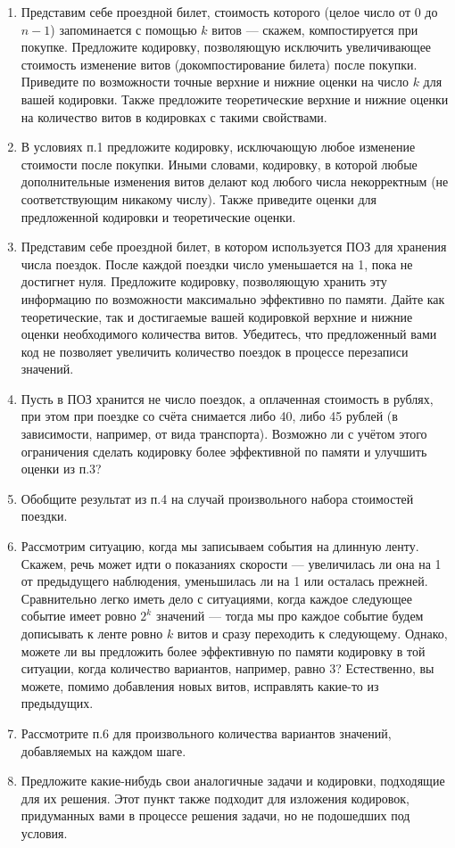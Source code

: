 \begin{enumerate}
\item Представим себе проездной билет, стоимость которого (целое число от 0 до $n-1$) 
запоминается с помощью $k$ витов --- скажем, компостируется при покупке. Предложите кодировку, 
позволяющую исключить увеличивающее стоимость изменение витов (докомпостирование билета)
после покупки. Приведите по возможности точные верхние и нижние оценки на число $k$ для вашей кодировки. Также предложите 
теоретические верхние и нижние оценки на количество витов в кодировках с такими свойствами.
\item В условиях п.1 предложите кодировку, исключающую любое изменение стоимости после покупки.
Иными словами, кодировку, в которой любые дополнительные изменения витов делают код любого
числа некорректным (не соответствующим никакому числу). Также приведите оценки для предложенной 
кодировки и теоретические оценки.
\item Представим себе проездной билет, в котором используется ПОЗ для хранения числа поездок.
После каждой поездки число уменьшается на 1, пока не достигнет нуля. Предложите кодировку, 
позволяющую хранить эту информацию по возможности максимально эффективно по памяти. Дайте 
как теоретические, так и достигаемые вашей кодировкой верхние и нижние оценки необходимого количества 
витов.
Убедитесь, что предложенный вами код не позволяет увеличить количество поездок в процессе
перезаписи значений.
\item Пусть в ПОЗ хранится не число поездок, а оплаченная стоимость в рублях, при этом 
при поездке со счёта снимается либо 40, либо 45 рублей (в зависимости, например, от вида
транспорта). Возможно ли с учётом этого ограничения сделать кодировку более эффективной по
памяти и улучшить оценки из п.3?
\item Обобщите результат из п.4 на случай произвольного набора стоимостей поездки.
\item Рассмотрим ситуацию, когда мы записываем события на длинную ленту. Скажем, речь может
идти о показаниях скорости --- увеличилась ли она на 1 от предыдущего наблюдения, 
уменьшилась ли на 1 или осталась прежней. Сравнительно легко иметь дело с ситуациями, когда
каждое следующее событие имеет ровно $2^k$ значений --- тогда мы про каждое событие будем 
дописывать к ленте ровно $k$ витов и сразу переходить к следующему. 
Однако, можете ли вы предложить более эффективную по памяти кодировку в той ситуации, 
когда количество вариантов, например, равно 3? Естественно, вы можете, помимо добавления 
новых витов, исправлять какие-то из предыдущих.
\item Рассмотрите п.6 для произвольного количества вариантов значений, добавляемых на каждом шаге.
\item Предложите какие-нибудь свои аналогичные задачи и кодировки, подходящие для их решения. Этот пункт также подходит для изложения кодировок, придуманных вами в процессе решения задачи, но не подошедших под условия.
\end{enumerate}
